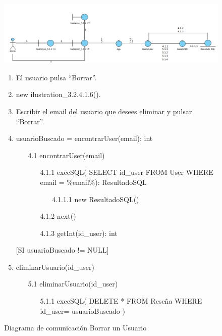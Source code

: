 ﻿\documentclass{report}
\begin{document}
            \begin{figure}[H]
                \centering
                \includegraphics[width=1.1\textwidth]{img/comunicacion/diagrama3.png}
                \caption{Diagrama de comunicación Borrar un Usuario}
            \clearpage
            \begin{enumerate}
                \item El usuario pulsa ``Borrar''.
                \item new ilustration\_3.2.4.1.6().
                \item Escribir el email del usuario que desees eliminar y pulsar ``Borrar''.
                \item usuarioBuscado = encontrarUser(email): int
                \begin{enumerate}
                    \item[4.1] encontrarUser(email)
                        \begin{enumerate}
                            \item[4.1.1] execSQL( SELECT id\_user FROM User WHERE email = \%email\%): ResultadoSQL
                                \begin{enumerate}
                                    \item[4.1.1.1] new ResultadoSQL()
                                \end{enumerate}
                            \item[4.1.2] next()
                            \item[4.1.3] getInt(id\_user): int
                        \end{enumerate}
                \end{enumerate}
                [SI usuarioBuscado != NULL]
                \item eliminarUsuario(id\_user)
                 \begin{enumerate}
                    \item[5.1] eliminarUsuario(id\_user)
                        \begin{enumerate}
                            \item[5.1.1] execSQL( DELETE * FROM Reseña WHERE id\_user= usuarioBuscado ) 

\end{enumerate}
\end{enumerate}
\end{enumerate}
\end{figure}
\end{document}
